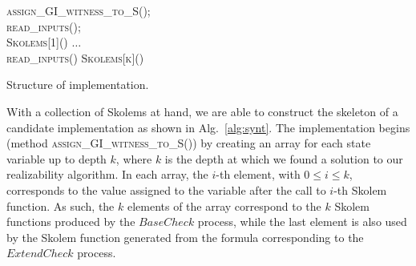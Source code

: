 %
%

\begin{algorithm2e}[]
\SetAlgoSkip{}
\BlankLine
  \textsc{assign\_GI\_witness\_to\_S()}; 	\\

\BlankLine
  \textsc{read\_inputs()}; 		\\
  \textsc{Skolems[1]()}\;
  $\ldots$\\
  \textsc{read\_inputs()}\;
  \textsc{Skolems[k]()}\;
  
\BlankLine  


\caption{Structure of implementation.}
\label{alg:synt}
\end{algorithm2e}


With a collection of Skolems at hand, we are able to construct the skeleton of
a candidate implementation as shown in Alg.~\ref{alg:synt}.
The implementation begins (method \textsc{assign\_GI\_witness\_to\_S()}) by
creating an array for each state variable up to depth $k$, where $k$ is the
depth at which we found a solution to our realizability algorithm.
In each array, the $i$-th element, with $0\leq i \leq k$, corresponds to the
value assigned to the variable after the call to $i$-th Skolem function. As
such, the $k$ elements of the array correspond to the $k$ Skolem
functions produced by the $\mathit{BaseCheck}$ process, while the last element
is also used by the Skolem function generated from the formula corresponding to
the $\mathit{ExtendCheck}$ process.

